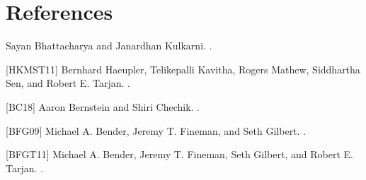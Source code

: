 \documentclass{article}
\begin{document}
\section{References}

\begin{flushleft}
[BK18] Sayan Bhattacharya and Janardhan Kulkarni. .
\newline

[HKMST11] Bernhard Haeupler, Telikepalli Kavitha, Rogers Mathew, Siddhartha Sen, and Robert E. Tarjan. .
\newline

[BC18] Aaron Bernstein and Shiri Chechik. .
\newline

[BFG09] Michael A. Bender, Jeremy T. Fineman, and Seth Gilbert. .
\newline

[BFGT11] Michael A. Bender, Jeremy T. Fineman, Seth Gilbert, and Robert E. Tarjan. .
\end{flushleft}
\end{document}
